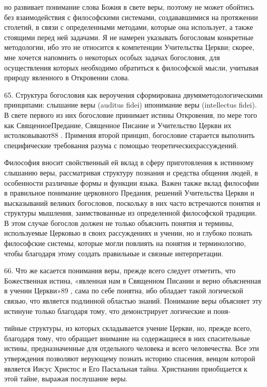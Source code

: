 \documentclass[a5paper,10pt]{article}
\begin{document}
но развивает понимание слова Божия в свете веры, поэтому не может обойтись без
взаимодействия с философскими системами, создававшимися на протяжении столетий,
в связи с определенными методами, которые она использует, а также стоящими
перед ней задачами. Я не намерен указывать богословам конкретные методологии,
ибо это не относится к компетенции Учительства Церкви; скорее, мне хочется
напомнить о некоторых особых задачах богословия, для осуществления которых
необходимо обратиться к философской мысли, учитывая природу явленного в
Откровении слова.

65. Структура богословия как вероучения сформирована двумяметодологическими
принципами: слышание веры (auditus fidei) ипонимание веры (intellectus fidei).
В свете первого из них богословие принимает истины Откровения, по мере того как
СвященноеПредание, Священное Писание и Учительство Церкви их истолковывают88 .
Применяя второй принцип, богословие старается выполнить специфические
требования разума с помощью теоретическихрассуждений.

Философия вносит свойственный ей вклад в сферу приготовления к истинному
слышанию веры, рассматривая структуру познания и средства общения людей, в
особенности различные формы и функции языка. Важен также вклад философии в
правильное понимание церковного Предания, решений Учительства Церкви и
высказываний великих богословов, поскольку в них часто встречаются понятия и
структуры мышления, заимствованные из определенной философской традиции. В этом
случае богослов должен не только объяснить понятия и термины, используемые
Церковью в своих рассуждениях и учении, но и глубоко познать философские
системы, которые могли повлиять на понятия и терминологию, чтобы благодаря
этому создать правильные и связные интерпретации.

66. Что же касается понимания веры, прежде всего следует отметить, что
Божественная истина, «явленная нам в Священном Писании и верно объясненная в
учении Церкви»89 , сама по себе понятна, ибо обладает такой логической связью,
что является подлинной областью знаний. Понимание веры объясняет эту истинуне
только благодаря тому, что демонстрирует логические и поня-

тийные структуры, из которых складывается учение Церкви, но, прежде всего,
благодаря тому, что обращает внимание на содержащиеся в них спасительные
истины, предназначенные для отдельного человека и всего человечества. Все эти
утверждения позволяют верующему познать историю спасения, венцом которой
является Иисус Христос и Его Пасхальная тайна. Христианин приобщается к этой
тайне, выражая послушание веры.
\end{document}
